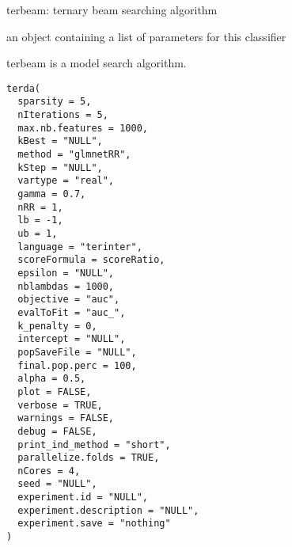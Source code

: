 \documentclass[a4paper]{book}
\begin{document}
%
\begin{Details}
terbeam: ternary beam searching algorithm
\end{Details}
%
\begin{Value}
an object containing a list of parameters for this classifier
\end{Value}
%
\begin{Description}
terbeam is a model search algorithm.
\end{Description}
%
\begin{Usage}
\begin{verbatim}
terda(
  sparsity = 5,
  nIterations = 5,
  max.nb.features = 1000,
  kBest = "NULL",
  method = "glmnetRR",
  kStep = "NULL",
  vartype = "real",
  gamma = 0.7,
  nRR = 1,
  lb = -1,
  ub = 1,
  language = "terinter",
  scoreFormula = scoreRatio,
  epsilon = "NULL",
  nblambdas = 1000,
  objective = "auc",
  evalToFit = "auc_",
  k_penalty = 0,
  intercept = "NULL",
  popSaveFile = "NULL",
  final.pop.perc = 100,
  alpha = 0.5,
  plot = FALSE,
  verbose = TRUE,
  warnings = FALSE,
  debug = FALSE,
  print_ind_method = "short",
  parallelize.folds = TRUE,
  nCores = 4,
  seed = "NULL",
  experiment.id = "NULL",
  experiment.description = "NULL",
  experiment.save = "nothing"
)
\end{verbatim}
\end{Usage}
%
\end{document}
